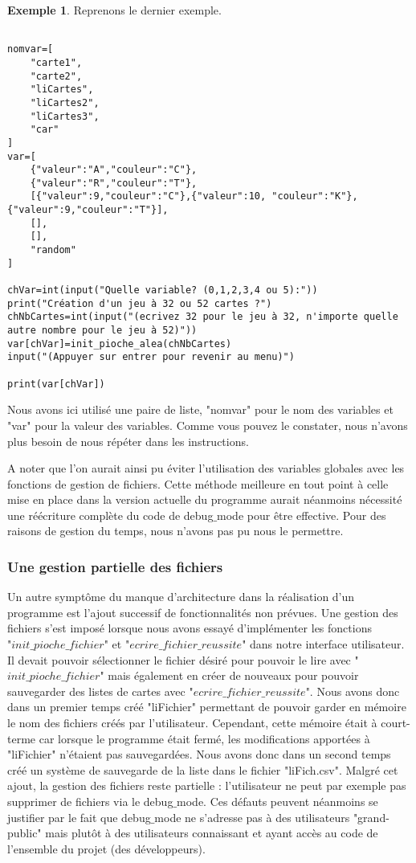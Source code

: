 \documentclass[10pt,a4paper,french,titlepage]{article}
\theoremstyle{definition}
\newtheorem{exmp}{Exemple}
\begin{document}
\begin{exmp}
Reprenons le dernier exemple.
\begin{lstlisting}

nomvar=[
    "carte1",
    "carte2",
    "liCartes",
    "liCartes2",
    "liCartes3",
    "car"
]
var=[
    {"valeur":"A","couleur":"C"},
    {"valeur":"R","couleur":"T"},
    [{"valeur":9,"couleur":"C"},{"valeur":10, "couleur":"K"},{"valeur":9,"couleur":"T"}],
    [],
    [],
    "random"
]

chVar=int(input("Quelle variable? (0,1,2,3,4 ou 5):"))
print("Création d'un jeu à 32 ou 52 cartes ?")
chNbCartes=int(input("(ecrivez 32 pour le jeu à 32, n'importe quelle autre nombre pour le jeu à 52)"))
var[chVar]=init_pioche_alea(chNbCartes)
input("(Appuyer sur entrer pour revenir au menu)")

print(var[chVar])
\end{lstlisting}
Nous avons ici utilisé une paire de liste, "nomvar" pour le nom des variables et "var" pour la valeur des variables. Comme vous pouvez le constater, nous n'avons plus besoin de nous répéter dans les instructions.
\end{exmp}
A noter que l'on aurait ainsi pu éviter l'utilisation des variables globales avec les fonctions de gestion de fichiers. Cette méthode meilleure en tout point à celle mise en place dans la version actuelle du programme aurait néanmoins nécessité une réécriture complète du code de debug$\_$mode pour être effective. Pour des raisons de gestion du temps, nous n'avons pas pu nous le permettre.
\subsubsection{Une gestion partielle des fichiers}
Un autre symptôme du manque d'architecture dans la réalisation d'un programme est l'ajout successif de fonctionnalités non prévues. Une gestion des fichiers s'est imposé lorsque nous avons essayé d'implémenter les fonctions \\"$init\_pioche\_fichier$" et "$ecrire\_fichier\_reussite$" dans notre interface utilisateur. Il devait pouvoir sélectionner le fichier désiré pour pouvoir le lire avec "$init\_pioche\_fichier$" mais également en créer de nouveaux pour pouvoir sauvegarder des listes de cartes avec "$ecrire\_fichier\_reussite$". Nous avons donc dans un premier temps créé "liFichier" permettant de pouvoir garder en mémoire le nom des fichiers créés par l'utilisateur. Cependant, cette mémoire était à court-terme car lorsque le programme était fermé, les modifications apportées à "liFichier" n'étaient pas sauvegardées. Nous avons donc dans un second temps créé un système de sauvegarde de la liste dans le fichier "liFich.csv". Malgré cet ajout, la gestion des fichiers reste partielle : l'utilisateur ne peut par exemple pas supprimer de fichiers via le debug$\_$mode. Ces défauts peuvent néanmoins se justifier par le fait que debug$\_$mode ne s'adresse pas à des utilisateurs "grand-public" mais plutôt à des utilisateurs connaissant et ayant accès au code de l'ensemble du projet (des développeurs).
\end{document}

